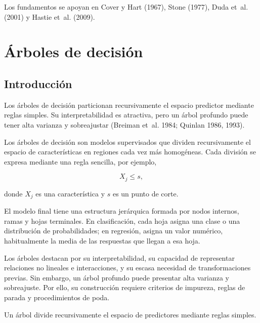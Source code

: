 \documentclass[
  spanish,
  10.5pt,
  letterpaper,
  DIV=11,
  numbers=noendperiod,
  oneside,
  open=any]{scrreprt}
\theoremstyle{definition}
\theoremstyle{definition}
\theoremstyle{plain}
\theoremstyle{remark}
\begin{document}
Los fundamentos se apoyan en Cover y Hart (1967), Stone (1977), Duda
et~al. (2001) y Hastie et~al. (2009).

\chapter{\texorpdfstring{Árboles de
decisión}{Árboles de decisión}}\label{sec-arboles-decision}

\section*{Introducción}\label{introducciuxf3n-13}


Los árboles de decisión particionan recursivamente el espacio predictor
mediante reglas simples. Su interpretabilidad es atractiva, pero un
árbol profundo puede tener alta varianza y sobreajustar (Breiman et~al.
1984; Quinlan 1986, 1993).

Los árboles de decisión son modelos supervisados que dividen
recursivamente el espacio de características en regiones cada vez más
homogéneas. Cada división se expresa mediante una regla sencilla, por
ejemplo,

\[
X_j \leq s,
\]

donde \(X_j\) es una característica y \(s\) es un punto de corte.

El modelo final tiene una estructura jerárquica formada por nodos
internos, ramas y hojas terminales. En clasificación, cada hoja asigna
una clase o una distribución de probabilidades; en regresión, asigna un
valor numérico, habitualmente la media de las respuestas que llegan a
esa hoja.

Los árboles destacan por su interpretabilidad, su capacidad de
representar relaciones no lineales e interacciones, y su escasa
necesidad de transformaciones previas. Sin embargo, un árbol profundo
puede presentar alta varianza y sobreajuste. Por ello, su construcción
requiere criterios de impureza, reglas de parada y procedimientos de
poda.

\begin{tcolorbox}[enhanced jigsaw, arc=.35mm, bottomrule=.15mm, bottomtitle=1mm, breakable, colback=white, colbacktitle=quarto-callout-important-color!10!white, colframe=quarto-callout-important-color-frame, coltitle=black, left=2mm, leftrule=.75mm, opacityback=0, opacitybacktitle=0.6, rightrule=.15mm, title=\textcolor{quarto-callout-important-color}{\faExclamation}\hspace{0.5em}{Definición esencial}, titlerule=0mm, toprule=.15mm, toptitle=1mm]

Un árbol divide recursivamente el espacio de predictores mediante reglas
simples.

\end{tcolorbox}
\end{document}
